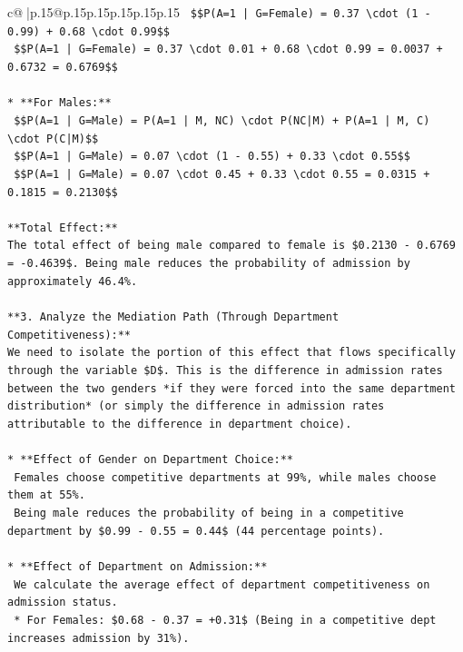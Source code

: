 \documentclass{article}
\begin{document}
{\begin{supertabular}{c@{$\;$}|p{.15\linewidth}@{}p{.15\linewidth}p{.15\linewidth}p{.15\linewidth}p{.15\linewidth}p{.15\linewidth}}
{{{\texttt{    \$\$P(A=1 | G=Female) = 0.37 \textbackslash{}cdot (1 {-} 0.99) + 0.68 \textbackslash{}cdot 0.99\$\$} \\
\texttt{    \$\$P(A=1 | G=Female) = 0.37 \textbackslash{}cdot 0.01 + 0.68 \textbackslash{}cdot 0.99 = 0.0037 + 0.6732 = 0.6769\$\$} \\
\\ 
\texttt{*   **For Males:**} \\
\texttt{    \$\$P(A=1 | G=Male) = P(A=1 | M, NC) \textbackslash{}cdot P(NC|M) + P(A=1 | M, C) \textbackslash{}cdot P(C|M)\$\$} \\
\texttt{    \$\$P(A=1 | G=Male) = 0.07 \textbackslash{}cdot (1 {-} 0.55) + 0.33 \textbackslash{}cdot 0.55\$\$} \\
\texttt{    \$\$P(A=1 | G=Male) = 0.07 \textbackslash{}cdot 0.45 + 0.33 \textbackslash{}cdot 0.55 = 0.0315 + 0.1815 = 0.2130\$\$} \\
\\ 
\texttt{**Total Effect:**} \\
\texttt{The total effect of being male compared to female is \$0.2130 {-} 0.6769 = {-}0.4639\$. Being male reduces the probability of admission by approximately 46.4\%.} \\
\\ 
\texttt{**3. Analyze the Mediation Path (Through Department Competitiveness):**} \\
\texttt{We need to isolate the portion of this effect that flows specifically through the variable \$D\$. This is the difference in admission rates between the two genders *if they were forced into the same department distribution* (or simply the difference in admission rates attributable to the difference in department choice).} \\
\\ 
\texttt{*   **Effect of Gender on Department Choice:**} \\
\texttt{    Females choose competitive departments at 99\%, while males choose them at 55\%.} \\
\texttt{    Being male reduces the probability of being in a competitive department by \$0.99 {-} 0.55 = 0.44\$ (44 percentage points).} \\
\\ 
\texttt{*   **Effect of Department on Admission:**} \\
\texttt{    We calculate the average effect of department competitiveness on admission status.} \\
\texttt{    *   For Females: \$0.68 {-} 0.37 = +0.31\$ (Being in a competitive dept increases admission by 31\%).} \\
}}}
\end{supertabular}}
\end{document}
